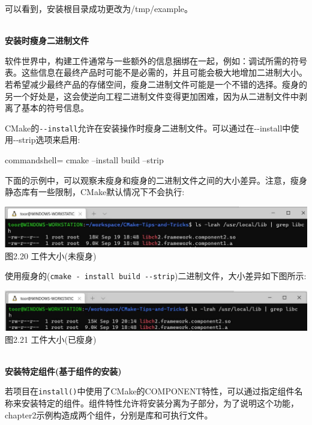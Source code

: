 可以看到，安装根目录成功更改为/tmp/example。

\hspace*{\fill} \\ %
\noindent
\textbf{安装时瘦身二进制文件}

软件世界中，构建工件通常与一些额外的信息捆绑在一起，例如：调试所需的符号表。这些信息在最终产品时可能不是必需的，并且可能会极大地增加二进制大小。若希望减少最终产品的存储空间，瘦身二进制文件可能是一个不错的选择。瘦身的另一个好处是，这会使逆向工程二进制文件变得更加困难，因为从二进制文件中剥离了基本的符号信息。

CMake的\texttt{-{}-install}允许在安装操作时瘦身二进制文件。可以通过在-{}-install中使用-{}-strip选项来启用:

\begin{tcblisting}{commandshell={}}
cmake --install build --strip
\end{tcblisting}

下面的示例中，可以观察未瘦身和瘦身的二进制文件之间的大小差异。注意，瘦身静态库有一些限制，CMake默认情况下不会执行:

\begin{center}
\includegraphics[width=1.\textwidth]{content/1/chapter2/images/20.jpg}\\
图2.20 工件大小(未瘦身)
\end{center}

使用瘦身的(\texttt{cmake - install build -{}-strip})二进制文件，大小差异如下图所示:

\begin{center}
\includegraphics[width=1.\textwidth]{content/1/chapter2/images/21.jpg}\\
图2.21 工件大小(已瘦身)
\end{center}

\hspace*{\fill} \\ %
\noindent
\textbf{安装特定组件(基于组件的安装)}

若项目在\texttt{install()}中使用了CMake的COMPONENT特性，可以通过指定组件名称来安装特定的组件。组件特性允许将安装分离为子部分，为了说明这个功能，chapter2示例构造成两个组件，分别是库和可执行文件。

